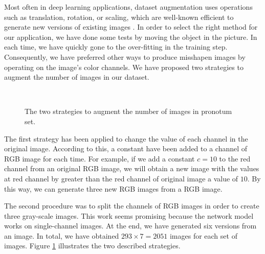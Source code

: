 \documentclass[review]{elsarticle}
\begin{document}
Most often in deep learning applications, dataset augmentation uses
operations such as translation, rotation, or scaling, which are
well-known efficient to generate new versions of existing images
\cite{krizhevsky2012imagenet, shorten2019survey}. In order to select
the right method for our application, we have done some tests by
moving the object in the picture. In each time, we have quickly gone
to the over-fitting in the training step. Consequently, we have
preferred other ways to produce misshapen images by operating on the
image's color channels. We have proposed two strategies to augment the
number of images in our dataset.


\begin{figure}[h!]
    \centering
    ~~
    \caption{The two strategies to augment the number of images in pronotum set.}
    \label{figdataauge}
\end{figure}

The first strategy has been applied to change the value of each
channel in the original image. According to this, a constant have been
added to a channel of RGB image for each time. For example, if we add
a constant $c = 10$ to the red channel from an original RGB image, we
will obtain a new image with the values at red channel by greater than
the red channel of original image a value of $10$. By this way, we can
generate three new RGB images from a RGB image. 

The second procedure was to split the channels of RGB images in order
to create three gray-scale images. This work seems promising because
the network model works on single-channel images. At the end, we have
generated six versions from an image. In total, we have obtained $293
\times 7 = 2051$ images for each set of images. Figure
\ref{figdataauge} illustrates the two described strategies.
\end{document}
